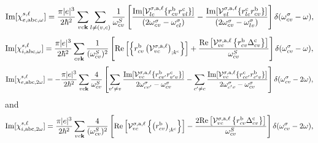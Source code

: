 \begin{equation}\label{calvimchiewn}
\mathrm{Im}[\chi_{e,\mathrm{a}\mathrm{b}\mathrm{c},\omega}^{s,\ell}] =
\frac{\pi |e|^3}{2\hbar^2}\sum_{vc\mathbf{k}}\sum_{l\neq(v,c)}\frac{1}{\omega^{S}_{cv}}
\left[
\frac{\mathrm{Im}[\mathcal{V}^{\sigma,\text{a},\ell}_{lc}\{r^{\mathrm{b}}_{cv}r^{\mathrm{c}}_{vl}\}]}
{(2\omega^\sigma_{cv}-\omega^\sigma_{cl})} 
-\frac{\mathrm{Im}[\mathcal{V}^{\sigma,\text{a},\ell}_{vl}\{r^{\mathrm{c}}_{lc}r^{\mathrm{b}}_{cv}\}]}
{(2\omega^\sigma_{cv}-\omega^\sigma_{lv})}
\right]\delta(\omega^\sigma_{cv}-\omega),
\end{equation}  
\begin{equation}\label{calvimchiwn}
\mathrm{Im}[\chi_{i,\text{a}\text{b}\text{c},\omega}^{s,\ell}]
= \frac{\pi\vert e\vert^3}{2\hbar^2}\sum_{cv\mathbf{k}}\frac{1}{(\omega^{S}_{cv})^{2}}
\left[
\mathrm{Re}\left[\left\{r^{\text{b}}_{cv}\left(\mathcal{V}^{\sigma,\text{a},\ell}_{vc}\right)_{;k^{\text{c}}}\right\}\right]
+\frac{\mathrm{Re}\left[\mathcal{V}^{\sigma,\text{a},\ell}_{vc}\left\{r^{\text{b}}_{cv}
\Delta^{\text{c}}_{cv}\right\}\right]}{\omega^{S}_{cv}} 
\right]\delta(\omega^\sigma_{cv}-\omega),
\end{equation}
\begin{equation}\label{calvimchie2wn}
\mathrm{Im}[\chi_{e,\mathrm{a}\mathrm{b}\mathrm{c},2\omega}^{s,\ell}] =
-\frac{\pi |e|^3}{2\hbar^2}\sum_{vc\mathbf{k}}\frac{4}{\omega^{S}_{cv}}
\left[
\sum_{v'\ne
  v}\frac{\mathrm{Im}[\mathcal{V}^{\sigma,\text{a},\ell}_{vc}\{r^{\mathrm{b}}_{cv'}r^{\mathrm{c}}_{v'v}\}]}
{2\omega^\sigma_{cv'}-\omega^\sigma_{cv}}
- \sum_{c'\ne
  c}\frac{\mathrm{Im}[\mathcal{V}^{\sigma,\text{a},\ell}_{vc}\{r^{\mathrm{c}}_{cc'}r^{\mathrm{b}}_{c'v}\}]}
{2\omega^\sigma_{c'v}-\omega^\sigma_{cv}}
\right]\delta(\omega^\sigma_{cv}-2\omega),
\end{equation}
and
\begin{equation}\label{calvimchi2wn}
\mathrm{Im}[\chi_{i,\text{a}\text{b}\text{c},2\omega}^{s,\ell}] 
=
 \frac{\pi \vert
   e\vert^{3}}{2\hbar^2}\sum_{vc\mathbf{k}}\frac{4}{(\omega^{S}_{cv})^{2}}
\left[\mathrm{Re}\left[\mathcal{V}^{\sigma,\text{a},\ell}_{vc}\left\{\left(r^{\text{b}}_{cv}\right)_{;k^{\text{c}}}
\right\}\right] -
\frac{2\mathrm{Re}\left[\mathcal{V}^{\sigma,\text{a},\ell}_{vc}\left\{r^{\text{b}}_{cv}
\Delta^{\text{c}}_{cv}\right\}\right]}{\omega^{S}_{cv}}\right]\delta(\omega^\sigma_{cv}-2\omega)
,
\end{equation}

